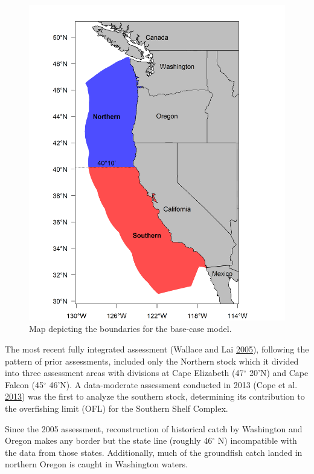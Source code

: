 \documentclass[12pt,]{article}
\begin{document}
\begin{figure}[htbp]
\centering
\includegraphics{Figures/assess_region_map_v2.png}
\caption{Map depicting the boundaries for the base-case model.
\label{fig:assess_region_map_Exec_Sum}}
\end{figure}

The most recent fully integrated assessment (Wallace and Lai
\protect\hyperlink{ref-Wallace2005}{2005}), following the pattern of
prior assessments, included only the Northern stock which it divided
into three assessment areas with divisions at Cape Elizabeth
(47\(^\circ\) 20'N) and Cape Falcon (45\(^\circ\) 46'N). A data-moderate
assessment conducted in 2013 (Cope et al.
\protect\hyperlink{ref-Cope2013}{2013}) was the first to analyze the
southern stock, determining its contribution to the overfishing limit
(OFL) for the Southern Shelf Complex.

Since the 2005 assessment, reconstruction of historical catch by
Washington and Oregon makes any border but the state line (roughly
46\(^\circ\) N) incompatible with the data from those states.
Additionally, much of the groundfish catch landed in northern Oregon is
caught in Washington waters.
\end{document}
